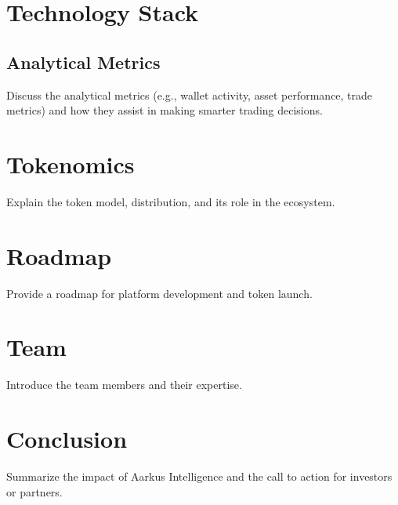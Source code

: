 \documentclass{article}
\begin{document}
\section{Technology Stack}
\subsection{Analytical Metrics}
Discuss the analytical metrics (e.g., wallet activity, asset performance, trade metrics) and how they assist in making smarter trading decisions.

\section{Tokenomics}
Explain the token model, distribution, and its role in the ecosystem.

\section{Roadmap}
Provide a roadmap for platform development and token launch.

\section{Team}
Introduce the team members and their expertise.

\section{Conclusion}
Summarize the impact of Aarkus Intelligence and the call to action for investors or partners.

\end{document}
